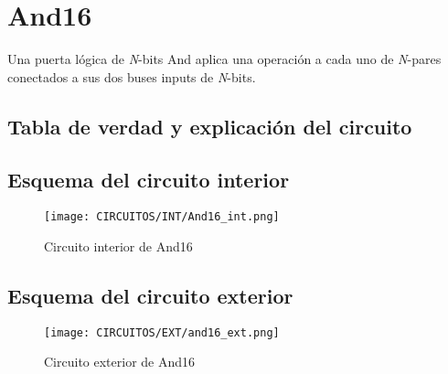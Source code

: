 \documentclass[12pt]{article}
\begin{document}
		\section{And16}
		Una puerta lógica de \textit{N}-bits And aplica una operación a cada uno de \textit{N}-pares conectados a sus dos buses inputs de \textit{N}-bits. \cite{nisan_nand2tetris_2005}
		\subsection{Tabla de verdad y explicación del circuito}
		\begin{table}[H]
			\centering
			\caption{Tabla de verdad de AND16}
			\label{tab:tab_and16}
		\end{table}

		\subsection{Esquema del circuito interior}
		\begin{figure}[H]
			\centering
			\texttt{[image: CIRCUITOS/INT/And16\_int.png]}
			\caption{Circuito interior de And16 \cite{circuitverse}}
			\label{fig:and16_int}
		\end{figure}
		\subsection{Esquema del circuito exterior}
		\begin{figure}[H]
			\centering
			\texttt{[image: CIRCUITOS/EXT/and16\_ext.png]}
			\caption{Circuito exterior de And16 \cite{circuitverse}}
			\label{fig:and16_ext}
		\end{figure}
\end{document}
